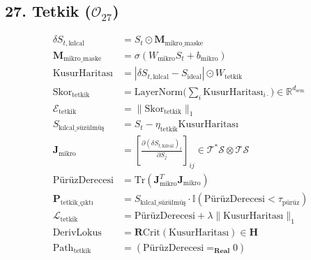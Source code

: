 \documentclass[11pt, a4paper]{article}
\begin{document}
\subsection{27. Tetkik ($\mathcal{O}_{27}$)}
\begin{align}
\delta S_{t, \text{kılcal}} &= S_t \odot \mathbf{M}_{\text{mikro\_maske}} \\
\mathbf{M}_{\text{mikro\_maske}} &= \sigma(W_{\text{mikro}} S_t + b_{\text{mikro}}) \\
\text{KusurHaritası} &= |\delta S_{t, \text{kılcal}} - S_{\text{ideal}}| \odot W_{\text{tetkik}} \\
\text{Skor}_{\text{tetkik}} &= \text{LayerNorm}\Big( \textstyle\sum_{i} \text{KusurHaritası}_{i\cdot} \Big) \in \mathbb{R}^{d_{\text{sem}}} \\
\mathcal{E}_{\text{tetkik}} &= \| \text{Skor}_{\text{tetkik}} \|_1 \\
S_{\text{kılcal\_süzülmüş}} &= S_t - \eta_{\text{tetkik}} \text{KusurHaritası} \\
\mathbf{J}_{\text{mikro}} &= \left[ \frac{\partial (\delta S_{t, \text{kılcal}})_i}{\partial S_j} \right]_{ij} \in \mathcal{T}^*\mathcal{S} \otimes \mathcal{T}\mathcal{S} \\
\text{PürüzDerecesi} &= \text{Tr}(\mathbf{J}_{\text{mikro}}^T \mathbf{J}_{\text{mikro}}) \\
\mathbf{P}_{\text{tetkik\_çıktı}} &= S_{\text{kılcal\_süzülmüş}} \cdot \mathbb{I}(\text{PürüzDerecesi} < \tau_{\text{pürüz}}) \\
\mathcal{L}_{\text{tetkik}} &= \text{PürüzDerecesi} + \lambda \| \text{KusurHaritası} \|_1 \\
\text{DerivLokus} &= \mathbf{R}\text{Crit}(\text{KusurHaritası}) \in \mathbf{H} \\
\text{Path}_{\text{tetkik}} &= (\text{PürüzDerecesi} =_{\mathbf{Real}} 0)
\end{align}
\end{document}
